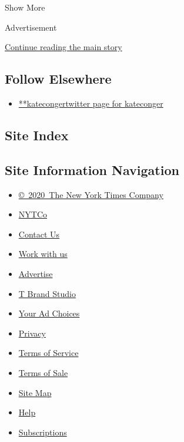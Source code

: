 Show More

Advertisement

\protect\hyperlink{after-mid2}{Continue reading the main story}

\hypertarget{follow-elsewhere}{%
\subsection{Follow Elsewhere}\label{follow-elsewhere}}

\begin{itemize}
\tightlist
\item
  \href{https://twitter.com/kateconger}{**katecongertwitter page for
  kateconger}
\end{itemize}

\hypertarget{site-index}{%
\subsection{Site Index}\label{site-index}}

\hypertarget{site-information-navigation}{%
\subsection{Site Information
Navigation}\label{site-information-navigation}}

\begin{itemize}
\tightlist
\item
  \href{https://help.nytimes3xbfgragh.onion/hc/en-us/articles/115014792127-Copyright-notice}{©~2020~The
  New York Times Company}
\end{itemize}

\begin{itemize}
\tightlist
\item
  \href{https://www.nytco.com/}{NYTCo}
\item
  \href{https://help.nytimes3xbfgragh.onion/hc/en-us/articles/115015385887-Contact-Us}{Contact
  Us}
\item
  \href{https://www.nytco.com/careers/}{Work with us}
\item
  \href{https://nytmediakit.com/}{Advertise}
\item
  \href{http://www.tbrandstudio.com/}{T Brand Studio}
\item
  \href{https://www.nytimes3xbfgragh.onion/privacy/cookie-policy\#how-do-i-manage-trackers}{Your
  Ad Choices}
\item
  \href{https://www.nytimes3xbfgragh.onion/privacy}{Privacy}
\item
  \href{https://help.nytimes3xbfgragh.onion/hc/en-us/articles/115014893428-Terms-of-service}{Terms
  of Service}
\item
  \href{https://help.nytimes3xbfgragh.onion/hc/en-us/articles/115014893968-Terms-of-sale}{Terms
  of Sale}
\item
  \href{https://spiderbites.nytimes3xbfgragh.onion}{Site Map}
\item
  \href{https://help.nytimes3xbfgragh.onion/hc/en-us}{Help}
\item
  \href{https://www.nytimes3xbfgragh.onion/subscription?campaignId=37WXW}{Subscriptions}
\end{itemize}

